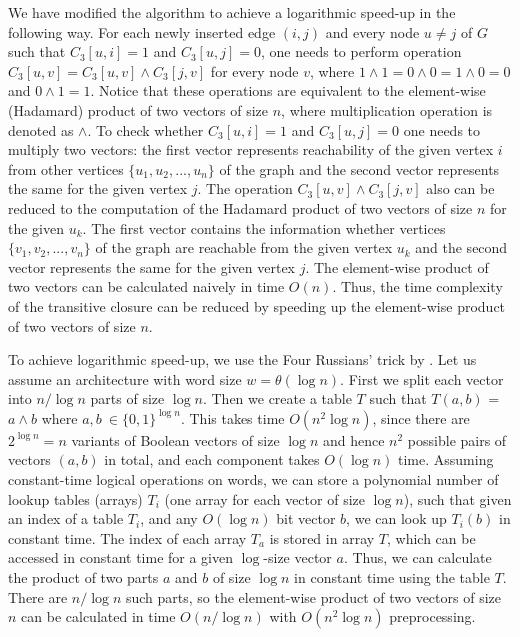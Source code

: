 We have modified the algorithm to achieve a logarithmic speed-up in the following way.
For each newly inserted edge $(i, j)$ and every node $u \neq j$ of $G$ such that $C_3[u, i] = 1$ and $C_3[u, j]=0$, one needs to perform operation $C_3[u,v] = C_3[u, v] \wedge C_3[j, v]$ for every node $v$, where $1 \wedge 1 = 0 \wedge 0 = 1 \wedge 0 = 0$ and $0 \wedge 1 = 1$.
Notice that these operations are equivalent to the element-wise (Hadamard) product of two vectors of size $n$, where multiplication operation is denoted as $\wedge$. To check whether $C_3[u, i] = 1$ and $C_3[u, j]=0$ one needs to multiply two vectors: the first vector represents reachability of the given vertex $i$ from other vertices $\{u_1, u_2, ..., u_n\}$ of the graph and the second vector represents the same for the given vertex $j$. The operation $C_3[u, v] \wedge C_3[j, v]$ also can be reduced to the computation of the Hadamard product of two vectors of size $n$ for the given $u_k$. The first vector contains the information whether vertices  $\{v_1, v_2, ..., v_n\}$ of the graph are reachable from the given vertex $u_k$ and the second vector represents the same for the given vertex $j$. The element-wise product of two vectors can be calculated naively in time $O(n)$. Thus, the time complexity of the transitive closure can be reduced by speeding up the element-wise product of two vectors of size $n$.


To achieve logarithmic speed-up, we use the Four Russians' trick by \cite{arlazarov1970economical}.
Let us assume an architecture with word size $w= \theta(\log n)$.
First we split each vector into $n/\log n$ parts of size $\log n$.
Then we create a table $T$ such that $T(a, b)$ = $a \wedge b$ where $a, b \ \in {\{0,1\}}^{\log n}$.
This takes time $O(n^2 \log n)$, since there are $2^{\log n} = n$ variants of Boolean vectors of size $\log n$ and hence $n^2$ possible pairs of vectors $(a, b)$ in total, and each component takes $O(\log n)$ time.
Assuming constant-time logical operations on words, we can store a polynomial number of lookup tables (arrays) $T_i$ (one array for each vector of size $\log n$), such that given an index of a table $T_i$, and any $O(\log n)$ bit vector $b$, we can look up $T_i(b)$ in constant time. The index of each array $T_a$ is stored in array $T$, which can be accessed in constant time for a given $\log$-size vector $a$. Thus, we can calculate the product of two parts $a$ and $b$ of size $\log n$ in constant time using the table $T$.
There are $n/\log n$ such parts, so the element-wise product of two vectors of size $n$ can be calculated in time $O(n/\log n)$ with $O(n^2 \log n)$ preprocessing.

